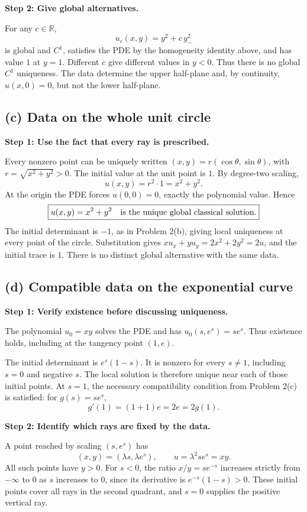 \documentclass[11pt,a4paper]{article}
\newcommand{\R}{\mathbb R}
\newcommand{\step}[1]{\par\medskip\textbf{#1}\par}
\newcommand{\answer}[1]{\begin{equation*}\boxed{\displaystyle #1}\end{equation*}}
\begin{document}
\step{Step 2: Give global alternatives.}
For any $c\in\R$,
\answer{u_c(x,y)=y^2+c\,y_-^2}
is global and $C^1$, satisfies the PDE by the homogeneity identity above, and has value $1$ at $y=1$. Different $c$ give different values in $y<0$. Thus there is no global $C^1$ uniqueness. The data determine the upper half-plane and, by continuity, $u(x,0)=0$, but not the lower half-plane.

\subsection*{(c) Data on the whole unit circle}
\step{Step 1: Use the fact that every ray is prescribed.}
Every nonzero point can be uniquely written $(x,y)=r(\cos\theta,\sin\theta)$, with $r=\sqrt{x^2+y^2}>0$. The initial value at the unit point is $1$. By degree-two scaling,
\[
 u(x,y)=r^2\cdot1=x^2+y^2.
\]
At the origin the PDE forces $u(0,0)=0$, exactly the polynomial value. Hence
\answer{u(x,y)=x^2+y^2\quad\hbox{is the unique global classical solution}.}
The initial determinant is $-1$, as in Problem 2(b), giving local uniqueness at every point of the circle. Substitution gives $xu_x+yu_y=2x^2+2y^2=2u$, and the initial trace is $1$. There is no distinct global alternative with the same data.

\subsection*{(d) Compatible data on the exponential curve}
\step{Step 1: Verify existence before discussing uniqueness.}
The polynomial $u_0=xy$ solves the PDE and has $u_0(s,e^s)=se^s$. Thus existence holds, including at the tangency point $(1,e)$.

The initial determinant is $e^s(1-s)$. It is nonzero for every $s\ne1$, including $s=0$ and negative $s$. The local solution is therefore unique near each of those initial points. At $s=1$, the necessary compatibility condition from Problem 2(c) is satisfied: for $g(s)=se^s$,
\[
 g'(1)=(1+1)e=2e=2g(1).
\]

\step{Step 2: Identify which rays are fixed by the data.}
A point reached by scaling $(s,e^s)$ has
\[
 (x,y)=(\lambda s,\lambda e^s),\qquad
 u=\lambda^2se^s=xy.
\]
All such points have $y>0$. For $s<0$, the ratio $x/y=se^{-s}$ increases strictly from $-\infty$ to $0$ as $s$ increases to $0$, since its derivative is $e^{-s}(1-s)>0$. These initial points cover all rays in the second quadrant, and $s=0$ supplies the positive vertical ray.
\end{document}

